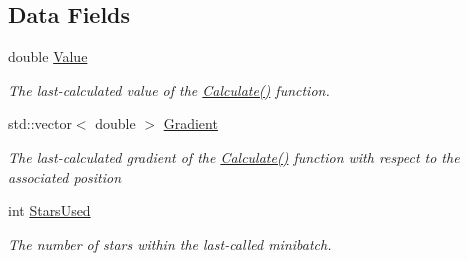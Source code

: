 \subsection*{Data Fields}
\begin{DoxyCompactItemize}
\item 
\mbox{\label{classLogLikelihood_a97ff9863958ffb93e74da07721a30cc6}} 
double \hyperlink{classLogLikelihood_a97ff9863958ffb93e74da07721a30cc6}{Value}
\begin{DoxyCompactList}\small\item\em The last-\/calculated value of the \hyperlink{classLogLikelihood_a748d75e2eb89965246436eb6a9274004}{Calculate()} function. \end{DoxyCompactList}\item 
\mbox{\label{classLogLikelihood_af6d93b053cfdc1966318018831a849ec}} 
std\+::vector$<$ double $>$ \hyperlink{classLogLikelihood_af6d93b053cfdc1966318018831a849ec}{Gradient}
\begin{DoxyCompactList}\small\item\em The last-\/calculated gradient of the \hyperlink{classLogLikelihood_a748d75e2eb89965246436eb6a9274004}{Calculate()} function with respect to the associated {\ttfamily position} \end{DoxyCompactList}\item 
\mbox{\label{classLogLikelihood_a3a4e3a1d76a663bca3705b471af583cc}} 
int \hyperlink{classLogLikelihood_a3a4e3a1d76a663bca3705b471af583cc}{Stars\+Used}
\begin{DoxyCompactList}\small\item\em The number of stars within the last-\/called minibatch. \end{DoxyCompactList}\end{DoxyCompactItemize}
